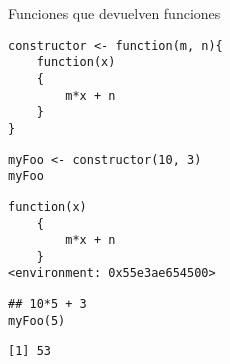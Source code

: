 \documentclass[xcolor={usenames,svgnames,dvipsnames}]{beamer}
\begin{document}
\begin{frame}[label={sec:org9a6bf12},fragile]{Funciones que devuelven funciones}
 \lstset{language=r,label= ,caption= ,captionpos=b,numbers=none}
\begin{lstlisting}
constructor <- function(m, n){
    function(x)
    {
        m*x + n
    }
}
\end{lstlisting}

\lstset{language=r,label= ,caption= ,captionpos=b,numbers=none}
\begin{lstlisting}
myFoo <- constructor(10, 3)
myFoo
\end{lstlisting}

\begin{verbatim}
function(x)
    {
        m*x + n
    }
<environment: 0x55e3ae654500>
\end{verbatim}


\lstset{language=r,label= ,caption= ,captionpos=b,numbers=none}
\begin{lstlisting}
## 10*5 + 3
myFoo(5)
\end{lstlisting}

\begin{verbatim}
[1] 53
\end{verbatim}
\end{frame}
\end{document}
